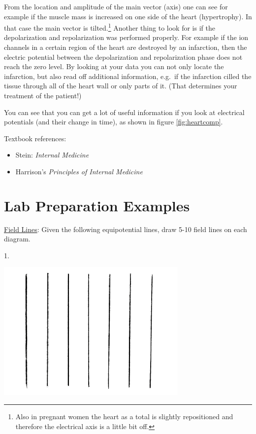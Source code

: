 From the location and amplitude of the main vector (axis) one can see for example if the muscle mass is increased on one side of the heart (hypertrophy). In that case the main vector is tilted.\footnote{Also in pregnant women the heart as a total is slightly repositioned and therefore the electrical axis is a little bit off.} Another thing to look for is if the depolarization and repolarization was performed properly. For example if the ion channels in a certain region of the heart are destroyed by an infarction, then the electric potential between the depolarization and repolarization phase does not reach the zero level. By looking at your data you can not only locate the infarction, but also read off additional information, e.g.\ if the infarction cilled the tissue through all of the heart wall or only parts of it. (That determines your treatment of the patient!) \myskip

You can see that you can get a lot of useful information if you look at electrical potentials (and their change in time), as shown in figure \ref{fig:heartcomp}. \myskip

Textbook references:
\begin{itemize}
    \item Stein: \emph{Internal Medicine}
    \item Harrison's \emph{Principles of Internal Medicine}
\end{itemize}

\newpage
\section{Lab Preparation Examples}

\noindent\underline{Field Lines}: Given the following equipotential lines, draw 5-10 field lines on each diagram. \myskip

\begin{minipage}[h]{0.95\textwidth}
    1.\begin{center}
        \includegraphics[width=0.7\textwidth]{./Exp1/pic/image9.png}
    \end{center}
\end{minipage}

